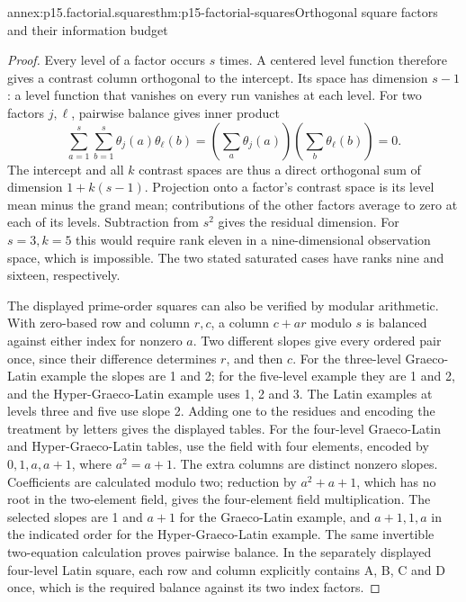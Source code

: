 \begin{annexitem}{annex:p15.factorial.squares}{thm:p15-factorial-squares}{Orthogonal square factors and their information budget}
\begin{proof}
Every level of a factor occurs \(s\) times. A centered level function
therefore gives a contrast column orthogonal to the intercept. Its space
has dimension \(s-1\): a level function that vanishes on every run
vanishes at each level. For two factors \(j,\ell\), pairwise balance
gives inner product
\[
 \sum_{a=1}^{s}\sum_{b=1}^{s}\theta_j(a)\theta_\ell(b)
 =(\sum_a\theta_j(a))(\sum_b\theta_\ell(b))=0.
\]
The intercept and all \(k\) contrast spaces are thus a direct orthogonal
sum of dimension \(1+k(s-1)\). Projection onto a factor's contrast
space is its level mean minus the grand mean; contributions of the other
factors average to zero at each of its levels. Subtraction from \(s^2\)
gives the residual dimension. For \(s=3,k=5\) this would require rank
eleven in a nine-dimensional observation space, which is impossible.
The two stated saturated cases have ranks nine and sixteen, respectively.

The displayed prime-order squares can also be verified by modular
arithmetic. With zero-based row and column \(r,c\), a column
\(c+ar\) modulo \(s\) is balanced against either index for nonzero
\(a\). Two different slopes give every ordered pair once, since
their difference determines \(r\), and then \(c\). For the three-level
Graeco-Latin example the slopes are 1 and 2; for the five-level example
they are 1 and 2, and the Hyper-Graeco-Latin example uses 1, 2 and 3.
The Latin examples at levels three and five use slope 2. Adding one to
the residues and encoding the treatment by letters gives the displayed
tables. For the four-level Graeco-Latin and Hyper-Graeco-Latin tables,
use the field with four elements, encoded by
\(0,1,a,a+1\), where \(a^2=a+1\). The extra columns are distinct
nonzero slopes. Coefficients are calculated modulo two; reduction by
\(a^2+a+1\), which has no root in the two-element field, gives the
four-element field multiplication. The selected slopes are
1 and \(a+1\) for the Graeco-Latin example, and
\(a+1,1,a\) in the indicated order for the Hyper-Graeco-Latin example.
The same invertible two-equation calculation proves pairwise balance.
In the separately displayed four-level Latin square, each row and column
explicitly contains A, B, C and D once, which is the required balance
against its two index factors.
\end{proof}
\end{annexitem}

